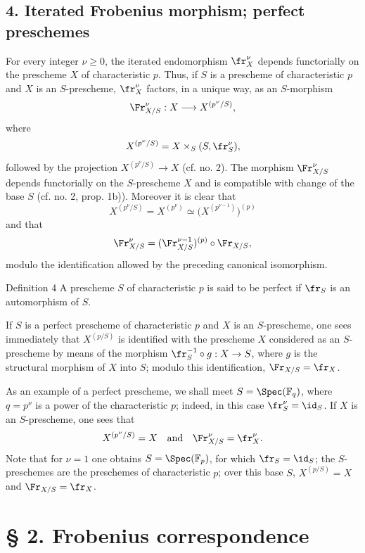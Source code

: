 \subsection*{4. Iterated Frobenius morphism; perfect preschemes}

For every integer $\nu\geq0$, the iterated endomorphism $\fr_X^\nu$ depends functorially on the prescheme $X$ of characteristic $p$. Thus, if $S$ is a prescheme of characteristic $p$ and $X$ is an $S$-prescheme, $\fr_X^\nu$ factors, in a unique way, as an $S$-morphism
\[
\Fr_{X/S}^\nu:X\longrightarrow X^{(p^\nu/S)},
\]
where
\[
X^{(p^\nu/S)}=X\times_S(S,\fr_S^\nu),
\]
followed by the projection $X^{(p^\nu/S)}\to X$ (cf. no. 2). The morphism $\Fr_{X/S}^\nu$ depends functorially on the $S$-prescheme $X$ and is compatible with change of the base $S$ (cf. no. 2, prop. 1b)). Moreover it is clear that
\[
X^{(p^\nu/S)}=X^{(p^\nu)}\simeq\bigl(X^{(p^{\nu-1})}\bigr)^{(p)}
\]
and that
\[
\Fr_{X/S}^\nu=(\Fr_{X/S}^{\nu-1})^{(p)}\circ\Fr_{X/S},
\]
modulo the identification allowed by the preceding canonical isomorphism.

\begin{statement}{Definition 4}
A prescheme $S$ of characteristic $p$ is said to be perfect if $\fr_S$ is an automorphism of $S$.
\end{statement}

If $S$ is a perfect prescheme of characteristic $p$ and $X$ is an $S$-prescheme, one sees immediately that $X^{(p/S)}$ is identified with the prescheme $X$ considered as an $S$-prescheme by means of the morphism $\fr_S^{-1}\circ g:X\to S$, where $g$ is the structural morphism of $X$ into $S$; modulo this identification, $\Fr_{X/S}=\fr_X$.

As an example of a perfect prescheme, we shall meet $S=\Spec(\mathbb F_q)$, where $q=p^\nu$ is a power of the characteristic $p$; indeed, in this case $\fr_S^\nu=\id_S$. If $X$ is an $S$-prescheme, one sees that
\[
X^{(p^\nu/S)}=X
\quad\text{and}\quad
\Fr_{X/S}^\nu=\fr_X^\nu.
\]
Note that for $\nu=1$ one obtains $S=\Spec(\mathbb F_p)$, for which $\fr_S=\id_S$; the $S$-preschemes are the preschemes of characteristic $p$; over this base $S$, $X^{(p/S)}=X$ and $\Fr_{X/S}=\fr_X$.

\section*{§ 2. Frobenius correspondence}

